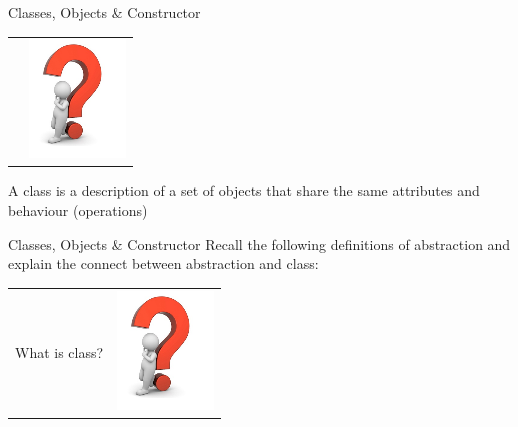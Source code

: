 \documentclass[14pt]{beamer}
\begin{document}
                  \begin{frame}{Classes, Objects \& Constructor}
                  \begin{tabular}{l l}
                      \begin{minipage}{0.65\textwidth}\end{minipage}
                      &
                      \begin{minipage}{0.25\textwidth}
                          \includegraphics[scale=.6]{COJ-M01-S03-Image5.png}
                      \end{minipage}
                  \end{tabular}
                  \begin{block}{}
                      A class is a description of a set of objects that share the same attributes and behaviour (operations)
                  \end{block}
              \end{frame}
              \begin{frame}{Classes, Objects \& Constructor}
              Recall the following definitions of abstraction and explain the connect between abstraction and class:
              \begin{tabular}{l l}
                  \begin{minipage}{0.65\textwidth}
                      What is class?
                  \end{minipage}
                  &
                  \begin{minipage}{0.25\textwidth}
                      \includegraphics[scale=.6]{COJ-M01-S03-Image5.png}
                  \end{minipage}
              \end{tabular}
          \end{frame}
\end{document}
